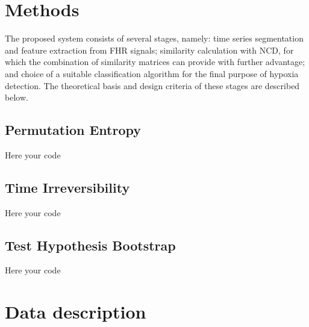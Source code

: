	\section{Methods} \label{sec:system}


The proposed system consists of several stages, namely: time series segmentation and feature extraction from  FHR signals; similarity calculation with NCD, for which the combination of similarity matrices can provide with further advantage; and choice of a suitable classification algorithm for the final purpose of hypoxia detection. The theoretical basis and design criteria of these stages are described below.



\subsection{Permutation Entropy}

Here your code



\subsection{Time Irreversibility}
Here your code


\subsection{Test Hypothesis Bootstrap}
Here your code



\section{Data description}\label{sec:data}


